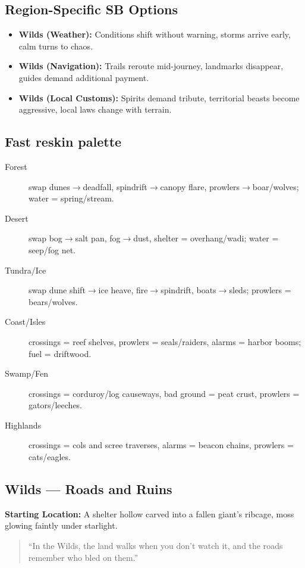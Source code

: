 \subsection*{Region-Specific SB Options}
\begin{itemize}
\item \textbf{Wilds (Weather):} Conditions shift without warning, storms arrive early, calm turns to chaos.
\item \textbf{Wilds (Navigation):} Trails reroute mid-journey, landmarks disappear, guides demand additional payment.
\item \textbf{Wilds (Local Customs):} Spirits demand tribute, territorial beasts become aggressive, local laws change with terrain.
\end{itemize}

\subsection*{Fast reskin palette}
\label{sec:wilderness-reskin-palette}
\begin{description}
\item[Forest] swap dunes$\rightarrow$deadfall, spindrift$\rightarrow$canopy flare, prowlers$\rightarrow$boar/wolves; water = spring/stream.
\item[Desert] swap bog$\rightarrow$salt pan, fog$\rightarrow$dust, shelter = overhang/wadi; water = seep/fog net.
\item[Tundra/Ice] swap dune shift$\rightarrow$ice heave, fire$\rightarrow$spindrift, boats$\rightarrow$sleds; prowlers = bears/wolves.
\item[Coast/Isles] crossings = reef shelves, prowlers = seals/raiders, alarms = harbor booms; fuel = driftwood.
\item[Swamp/Fen] crossings = corduroy/log causeways, bad ground = peat crust, prowlers = gators/leeches.
\item[Highlands] crossings = cols and scree traverses, alarms = beacon chains, prowlers = cats/eagles.
\end{description}


\subsection*{Wilds — Roads and Ruins}
\textbf{Starting Location:} A shelter hollow carved into a fallen giant’s ribcage, moss glowing faintly under starlight.
\begin{quote}
“In the Wilds, the land walks when you don’t watch it, and the roads remember who bled on them.”
\end{quote}

